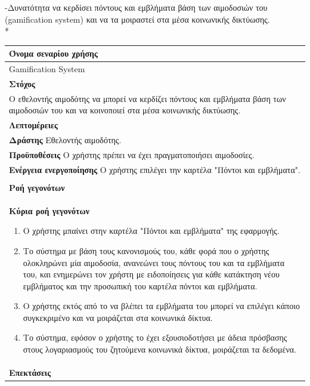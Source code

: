 -Δυνατότητα να κερδίσει πόντους και εμβλήματα βάση των αιμοδοσιών του (gamification system) και να τα μοιραστεί στα μέσα κοινωνικής δικτύωσης.
\\*
\begin{table}[H]
	\begin{center}
	    \begin{tabular}{|p{\dimexpr \linewidth-2\tabcolsep}|}
	    \hline
	    \rowcolor{grayy}
	    \textbf{Όνομα σεναρίου χρήσης}
	    \\ \hline    
	     Gamification System
	     \\ \hline
	    \rowcolor{grayy}
	    \textbf{\textbf{Στόχος}}
	    \\ \hline
	 	 Ο εθελοντής αιμοδότης να μπορεί να κερδίζει πόντους και εμβλήματα βάση των αιμοδοσιών του και να κοινοποιεί στα μέσα κοινωνικής δικτύωσης.
	    \\ \hline
	    \rowcolor{grayy}
	    \textbf{Λεπτομέρειες}
	    \\ \hline
		\textbf{Δράστης} Εθελοντής αιμοδότης.
		\\*
		\textbf{Προϋποθέσεις} Ο χρήστης πρέπει να έχει πραγματοποιήσει αιμοδοσίες.
		\\*
		\textbf{Ενέργεια ενεργοποίησης} Ο χρήστης επιλέγει την καρτέλα "Πόντοι και εμβλήματα".
		\\ \hline
	    \\ \hline
		\rowcolor{grayy}    
	    \textbf{Ροή γεγονότων}
	    \\* 
		\textbf{Κύρια ροή γεγονότων}
		\begin{enumerate}
		\item	 Ο χρήστης μπαίνει  στην καρτέλα "Πόντοι και εμβλήματα" της εφαρμογής.
		\item  Το σύστημα με βάση τους κανονισμούς του, κάθε φορά που ο χρήστης ολοκληρώνει μία αιμοδοσία, ανανεώνει τους πόντους του και τα εμβλήματα του, και ενημερώνει τον χρήστη με ειδοποίησεις για κάθε κατάκτηση νέου εμβλήματος και την προσωπική του καρτέλα πόντοι και εμβλήματα.
		\item Ο χρήστης εκτός από το να βλέπει τα εμβλήματα του μπορεί να επιλέγει κάποιο συγκεκριμένο και να μοιράζεται στα κοινωνικά δίκτυα.
		\item Το σύστημα, εφόσον ο χρήστης το έχει εξουσιοδοτήσει με άδεια πρόσβασης στους λογαριασμούς του ζητούμενα κοινωνικά δίκτυα, μοιράζεται τα δεδομένα.
		\end{enumerate}
		\\*
		\textbf{Επεκτάσεις}
		   \\ \hline

\end{tabular}
\end{center}
\end{table}
